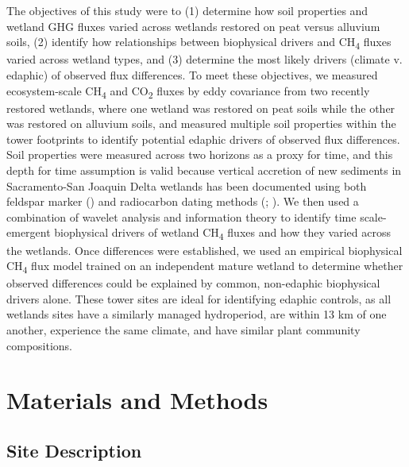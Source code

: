 \documentclass[
  12pt,
]{article}
\begin{document}
The objectives of this study were to (1) determine how soil properties
and wetland GHG fluxes varied across wetlands restored on peat versus
alluvium soils, (2) identify how relationships between biophysical
drivers and CH\textsubscript{4} fluxes varied across wetland types, and
(3) determine the most likely drivers (climate v. edaphic) of observed
flux differences. To meet these objectives, we measured ecosystem-scale
CH\textsubscript{4} and CO\textsubscript{2} fluxes by eddy covariance
from two recently restored wetlands, where one wetland was restored on
peat soils while the other was restored on alluvium soils, and measured
multiple soil properties within the tower footprints to identify
potential edaphic drivers of observed flux differences. Soil properties
were measured across two horizons as a proxy for time, and this depth
for time assumption is valid because vertical accretion of new sediments
in Sacramento-San Joaquin Delta wetlands has been documented using both
feldspar marker () and radiocarbon dating methods
(;
). We then used a
combination of wavelet analysis and information theory to identify time
scale-emergent biophysical drivers of wetland CH\textsubscript{4} fluxes
and how they varied across the wetlands. Once differences were
established, we used an empirical biophysical CH\textsubscript{4} flux
model trained on an independent mature wetland to determine whether
observed differences could be explained by common, non-edaphic
biophysical drivers alone. These tower sites are ideal for identifying
edaphic controls, as all wetlands sites have a similarly managed
hydroperiod, are within 13 km of one another, experience the same
climate, and have similar plant community compositions.

\section{Materials and Methods}\label{materials-and-methods}

\subsection{Site Description}\label{site-description}
\end{document}
